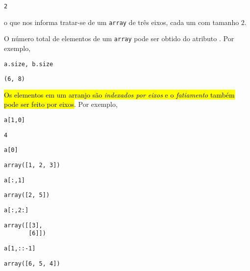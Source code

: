 \begin{verbatim}
2
\end{verbatim}

o que nos informa tratar-se de um \lstinline+array+ de três eixos, cada um com tamanho $2$.

O número total de elementos de um \lstinline+array+ pode ser obtido do atributo {\PYTHONnumpyDOTndarrayDOTsize}. Por exemplo,

\begin{lstlisting}
a.size, b.size
\end{lstlisting}

\begin{verbatim}
(6, 8)
\end{verbatim}

\hl{Os elementos em um arranjo são \emph{indexados por eixos} e o \emph{fatiamento} também pode ser feito por eixos}. Por exemplo,

\begin{lstlisting}
a[1,0]
\end{lstlisting}

\begin{verbatim}
4
\end{verbatim}

\begin{lstlisting}
a[0]
\end{lstlisting}

\begin{verbatim}
array([1, 2, 3])
\end{verbatim}

\begin{lstlisting}
a[:,1]
\end{lstlisting}

\begin{verbatim}
array([2, 5])
\end{verbatim}

\begin{lstlisting}
a[:,2:]
\end{lstlisting}

\begin{verbatim}
array([[3],
       [6]])
\end{verbatim}

\begin{lstlisting}
a[1,::-1]
\end{lstlisting}

\begin{verbatim}
array([6, 5, 4])
\end{verbatim}

